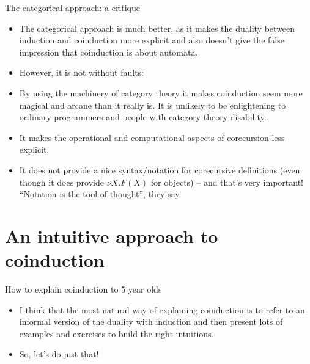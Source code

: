 \documentclass{beamer}
\begin{document}
\begin{frame}{The categorical approach: a critique}
\begin{itemize}
	\item The categorical approach is much better, as it makes the duality between induction and coinduction more explicit and also doesn't give the false impression that coinduction is about automata.
	\item However, it is not without faults:
	\item By using the machinery of category theory it makes coinduction seem more magical and arcane than it really is. It is unlikely to be enlightening to ordinary programmers and people with category theory disability.
	\item It makes the operational and computational aspects of corecursion less explicit.
	\item It does not provide a nice syntax/notation for corecursive definitions (even though it does provide $\nu X. F(X)$ for objects) -- and that's very important! ``Notation is the tool of thought'', they say.
\end{itemize}
\end{frame}

\section{An intuitive approach to coinduction}

\begin{frame}{How to explain coinduction to 5 year olds}
\begin{itemize}
	\item I think that the most natural way of explaining coinduction is to refer to an informal version of the duality with induction and then present lots of examples and exercises to build the right intuitions.
	\item So, let's do just that! 
\end{itemize}
\end{frame}
\end{document}
